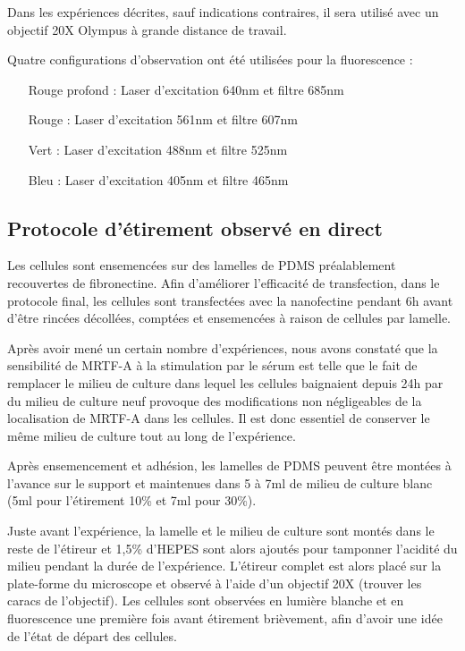 Dans les expériences décrites, sauf indications contraires, il sera utilisé avec un objectif 20X Olympus à grande distance de travail. 

Quatre configurations d'observation ont été utilisées pour la fluorescence : 
\begin{itemize}
\item[Rouge profond] : Laser d'excitation 640nm et filtre 685nm
\item[Rouge] : Laser d'excitation 561nm et filtre 607nm
\item[Vert] : Laser d'excitation 488nm et filtre 525nm
\item[Bleu] : Laser d'excitation 405nm et filtre 465nm
\end{itemize}
	
	\subsection{Protocole d'étirement observé en direct}
	Les cellules sont ensemencées sur des lamelles de PDMS préalablement recouvertes de fibronectine. Afin d'améliorer l'efficacité de transfection, dans le protocole final, les cellules sont transfectées avec la nanofectine pendant 6h avant d'être rincées décollées, comptées et ensemencées à raison de  cellules par lamelle. 
	
	Après avoir mené un certain nombre d'expériences, nous avons constaté que la sensibilité de MRTF-A à la stimulation par le sérum est telle que le fait de remplacer le milieu de culture dans lequel les cellules baignaient depuis 24h par du milieu de culture neuf provoque des modifications non négligeables de la localisation de MRTF-A dans les cellules. Il est donc essentiel de conserver le même milieu de culture tout au long de l'expérience. 
	
	Après ensemencement et adhésion, les lamelles de PDMS peuvent être montées à l'avance sur le support et maintenues dans 5 à 7ml de milieu de culture blanc (5ml pour l'étirement 10\% et 7ml pour 30\%). 
	
	Juste avant l'expérience, la lamelle et le milieu de culture sont montés dans le reste de l'étireur et 1,5\% d'HEPES sont alors ajoutés pour tamponner l'acidité du milieu pendant la durée de l'expérience. L'étireur complet est alors placé sur la plate-forme du microscope et observé à l'aide d'un objectif 20X (trouver les caracs de l'objectif). Les cellules sont observées en lumière blanche et en fluorescence une première fois avant étirement brièvement, afin d'avoir une idée de l'état de départ des cellules. 
	
